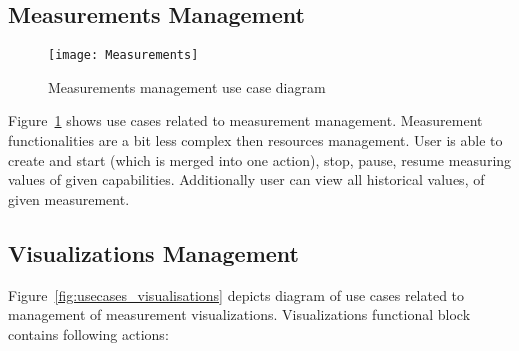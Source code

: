 \subsection{Measurements Management}
\label{subsec:measurement_mgmnt}

\begin{figure}[ht]
\centering
\texttt{[image: Measurements]}
\caption{Measurements management use case diagram}
\label{fig:usecases_measurements}
\end{figure}

Figure~\ref{fig:usecases_measurements} shows use cases related to measurement management. Measurement functionalities are a bit less complex then resources management. User is able to create and start (which is merged into one action), stop, pause, resume measuring values of given capabilities. Additionally user can view all historical values, of given measurement.

\subsection{Visualizations Management}
\label{subsec:visualizations_mgmnt}

Figure~\ref{fig:usecases_visualisations} depicts diagram of use cases related to management of measurement visualizations. Visualizations functional block contains following actions:

